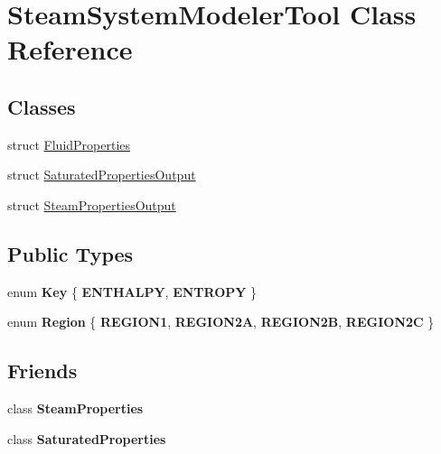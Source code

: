 \hypertarget{class_steam_system_modeler_tool}{}\section{Steam\+System\+Modeler\+Tool Class Reference}
\label{class_steam_system_modeler_tool}
\subsection*{Classes}
\begin{DoxyCompactItemize}
\item 
struct \hyperlink{struct_steam_system_modeler_tool_1_1_fluid_properties}{Fluid\+Properties}
\item 
struct \hyperlink{struct_steam_system_modeler_tool_1_1_saturated_properties_output}{Saturated\+Properties\+Output}
\item 
struct \hyperlink{struct_steam_system_modeler_tool_1_1_steam_properties_output}{Steam\+Properties\+Output}
\end{DoxyCompactItemize}
\subsection*{Public Types}
\begin{DoxyCompactItemize}
\item 
\mbox{\label{class_steam_system_modeler_tool_aed38516c350ca4ecf17b545e07d41dcd}} 
enum {\bfseries Key} \{ {\bfseries E\+N\+T\+H\+A\+L\+PY}, 
{\bfseries E\+N\+T\+R\+O\+PY}
 \}
\item 
\mbox{\label{class_steam_system_modeler_tool_a162eeadc7eb56a9b50b7a8f630eb8f05}} 
enum {\bfseries Region} \{ {\bfseries R\+E\+G\+I\+O\+N1}, 
{\bfseries R\+E\+G\+I\+O\+N2A}, 
{\bfseries R\+E\+G\+I\+O\+N2B}, 
{\bfseries R\+E\+G\+I\+O\+N2C}
 \}
\end{DoxyCompactItemize}
\subsection*{Friends}
\begin{DoxyCompactItemize}
\item 
\mbox{\label{class_steam_system_modeler_tool_a7b6c56e04b76b2d946235064998e84c9}} 
class {\bfseries Steam\+Properties}
\item 
\mbox{\label{class_steam_system_modeler_tool_a43a03ec32145468365cf841d9310263c}} 
class {\bfseries Saturated\+Properties}
\end{DoxyCompactItemize}


